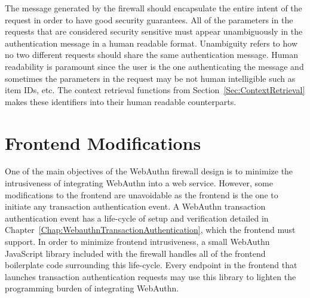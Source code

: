 
The message generated by the firewall should encapsulate the entire intent of the request in order to have good security guarantees. All of the parameters in the requests that are considered security sensitive must appear unambiguously in the authentication message in a human readable format. Unambiguity refers to how no two different requests should share the same authentication message. Human readability is paramount since the user is the one authenticating the message and sometimes the parameters in the request may be not human intelligible such as item IDs, etc. The context retrieval functions from Section~\ref{Sec:ContextRetrieval} makes these identifiers into their human readable counterparts.

\section{Frontend Modifications}

One of the main objectives of the WebAuthn firewall design is to minimize the intrusiveness of integrating WebAuthn into a web service. However, some modifications to the frontend are unavoidable as the frontend is the one to initiate any transaction authentication event. A WebAuthn transaction authentication event has a life-cycle of setup and verification detailed in Chapter~\ref{Chap:WebauthnTransactionAuthentication}, which the frontend must support. In order to minimize frontend intrusiveness, a small WebAuthn JavaScript library included with the firewall handles all of the frontend boilerplate code surrounding this life-cycle. Every endpoint in the frontend that launches transaction authentication requests may use this library to lighten the programming burden of integrating WebAuthn. 




